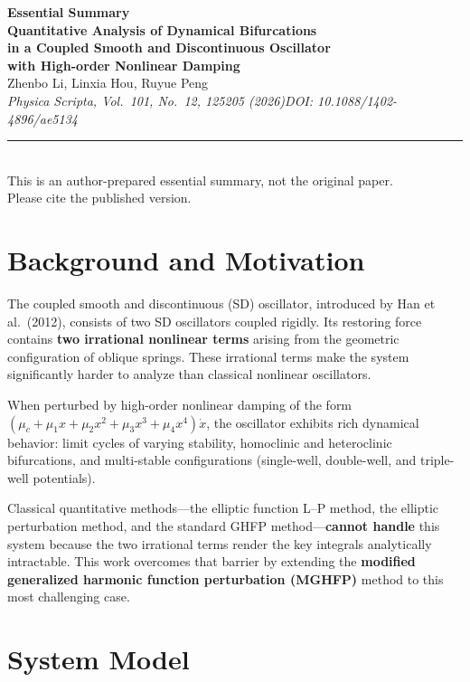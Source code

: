 \documentclass[11pt,a4paper]{article}
\begin{document}
\begin{center}
{\LARGE\bfseries\color{primary}Essential Summary}\\[12pt]
{\large\bfseries Quantitative Analysis of Dynamical Bifurcations\\in a Coupled Smooth and Discontinuous Oscillator\\with High-order Nonlinear Damping}\\[8pt]
{\normalsize Zhenbo Li, Linxia Hou, Ruyue Peng}\\[4pt]
{\small\itshape Physica Scripta, Vol.\ 101, No.\ 12, 125205 (2026)\quad DOI: 10.1088/1402-4896/ae5134}\\[6pt]
{\small\rule{0.7\textwidth}{0.5pt}}\\[4pt]
{\small\color{accent}This is an author-prepared essential summary, not the original paper.\\Please cite the published version.}
\end{center}

\vspace{0.5em}

\section{Background and Motivation}

The coupled smooth and discontinuous (SD) oscillator, introduced by Han et al.\ (2012), consists of two SD oscillators coupled rigidly. Its restoring force contains \textbf{two irrational nonlinear terms} arising from the geometric configuration of oblique springs. These irrational terms make the system significantly harder to analyze than classical nonlinear oscillators.

When perturbed by high-order nonlinear damping of the form $(\mu_c + \mu_1 x + \mu_2 x^2 + \mu_3 x^3 + \mu_4 x^4)\dot{x}$, the oscillator exhibits rich dynamical behavior: limit cycles of varying stability, homoclinic and heteroclinic bifurcations, and multi-stable configurations (single-well, double-well, and triple-well potentials).

Classical quantitative methods---the elliptic function L--P method, the elliptic perturbation method, and the standard GHFP method---\textbf{cannot handle} this system because the two irrational terms render the key integrals analytically intractable. This work overcomes that barrier by extending the \textbf{modified generalized harmonic function perturbation (MGHFP)} method to this most challenging case.

\section{System Model}
\end{document}
